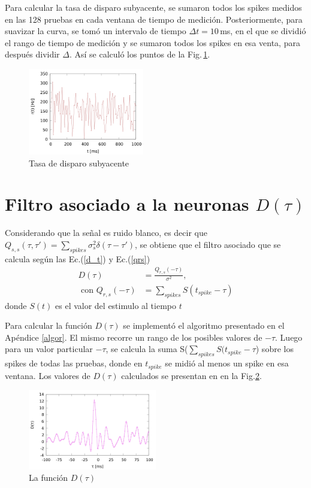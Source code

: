 Para calcular la tasa de disparo subyacente,  se sumaron todos los spikes medidos en las 128 pruebas en cada ventana de tiempo de medición. Posteriormente, para suavizar la curva, se tomó un intervalo de tiempo $\Delta t = 10\,$ms, en el que se dividió el rango de tiempo de medición y se sumaron todos los spikes en esa venta, para después dividir $\Delta$. Así se calculó los puntos de la Fig.\,\ref{r_t}.


\begin{figure}[H]
	\centering
	\includegraphics[width=0.45\textwidth]{../Graficos/r_t.png}
	\caption{Tasa de disparo subyacente}
	\label{r_t}
\end{figure}

\section*{Filtro asociado a la neuronas \texorpdfstring{$D(\tau)$}{}}

Considerando que la señal es ruido blanco, es decir que $Q_{s,s}(\tau, \tau')= \sum_{spikes} \sigma^2_s \delta(\tau-\tau')$, se obtiene que el filtro asociado que se  calcula  según las Ec.(\ref{d_t}) y Ec.(\ref{qrs}) 
\begin{align}
    D(\tau) &= \frac{Q_{r,s}(-\tau)}{\sigma^2}, \label{d_t}\\
    \text{  con } Q_{r,s}(-\tau)&= \sum_{spikes} S(t_{spike} - \tau) \label{qrs}
\end{align}
donde $S(t)$ es el valor del estimulo al tiempo $t$

Para calcular la función $D(\tau)$ se implementó  el  algoritmo presentado en el Apéndice \ref{algor}. El mismo recorre un rango de los posibles valores de $-\tau$. Luego para un valor particular $-\tau$, se calcula la suma S($\sum_{spikes} S(t_{spike} - \tau$) sobre los spikes de todas las pruebas, donde en $t_{spike}$ se midió al menos un spike en esa ventana. Los valores de $D(\tau)$ calculados se presentan en en la Fig.\ref{d_tau}. 
\begin{figure}[H]
	\centering
	\includegraphics[width=0.5\textwidth]{../Graficos/D_tau.png}
	\caption{La función $D(\tau)$ }
	\label{d_tau}
\end{figure}

